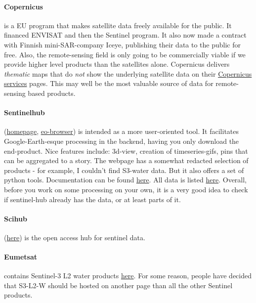 \paragraph{Copernicus} is a EU program that makes satellite data freely available for the public. It financed ENVISAT and then the Sentinel program.
It also now made a contract with Finnish mini-SAR-company Iceye, publishing their data to the public for free.
Also, the remote-sensing field is only going to be commercially viable if we provide higher level products than the satellites alone. 
Copernicus delivers \emph{thematic} maps that do \emph{not} show the underlying satellite data on their \href{https://www.copernicus.eu/en}{Copernicus services} pages.
This may well be the most valuable source of data for remote-sensing based products.


\paragraph{Sentinelhub} (\href{https://www.sentinel-hub.com/}{homepage}, \href{https://www.sentinel-hub.com/explore/eobrowser/}{eo-browser}) is intended as a more user-oriented tool.
It facilitates Google-Earth-esque processing in the backend, having you only download the end-product. Nice features include: 3d-view, creation of timeseries-gifs, pins that can be aggregated to a story.
The webpage has a somewhat redacted selection of products - for example, I couldn't find S3-water data.
But it also offers a set of python tools. Documentation can be found \href{https://sentinelhub-py.readthedocs.io/en/latest/examples/process_request.html#Example-5:-Other-Data-Collections}{here}.
All data is listed \href{https://www.sentinel-hub.com/explore/data/}{here}. 
Overall, before you work on some processing on your own, it is a very good idea to check if sentinel-hub already has the data, or at least parts of it.

\paragraph{Scihub} (\href{https://scihub.copernicus.eu/}{here}) is the open access hub for sentinel data.

\paragraph{Eumetsat} contains Sentinel-3 L2 water products \href{https://coda.eumetsat.int/#/home}{here}.
For some reason, people have decided that S3-L2-W should be hosted on another page than all the other Sentinel products.


